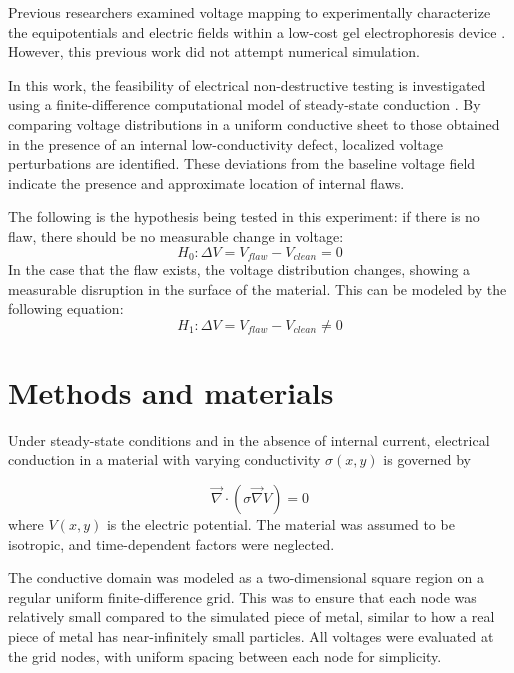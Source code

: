 \documentclass[10pt,journal,twoside]{IEEEtran} %
\begin{document}
Previous researchers examined voltage mapping to experimentally characterize the equipotentials and electric fields within a low-cost gel electrophoresis device \cite{ayyagari:2024:computational,baru:2024:demonstrating,cohen:2024:visualizing,edwards:2024:electric,kumar:2024:mapping}. However, this previous work did not attempt numerical simulation. 

In this work, the feasibility of electrical non-destructive testing is investigated using a finite-difference computational model of steady-state conduction \cite{press:1992:numerical}. By comparing voltage distributions in a uniform conductive sheet to those obtained in the presence of an internal low-conductivity defect, localized voltage perturbations are identified. These deviations from the baseline voltage field indicate the presence and approximate location of internal flaws.

The following is the hypothesis being tested in this experiment: if there is no flaw, there should be no measurable change in voltage:
\begin{equation} 
H_0: \Delta V = V_{flaw} - V_{clean} = 0
\end{equation}
In the case that the flaw exists, the voltage distribution changes, showing a measurable disruption in the surface of the material. This can be modeled by the following equation:
\begin{equation}
H_1: \Delta V = V_{flaw} - V_{clean} \neq 0
\end{equation}





\section{Methods and materials}
Under steady-state conditions and in the absence of internal current, electrical conduction in a material with varying conductivity $\sigma(x,y)$ is governed by

\begin{equation}
\vec{\nabla} \cdot (\sigma \vec{\nabla} V) = 0
\label{conductivity equation}
\end{equation} 
where $V(x,y)$ is the electric potential. The material was assumed to be isotropic, and time-dependent factors were neglected. 

The conductive domain was modeled as a two-dimensional square region on a regular uniform  finite-difference grid. This was to ensure that each node was relatively small compared to the simulated piece of metal, similar to how a real piece of metal has near-infinitely small particles. All voltages were evaluated at the grid nodes, with uniform spacing between each node for simplicity.
\end{document}
